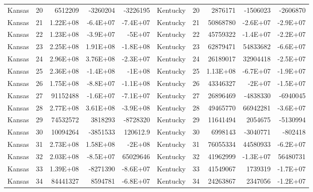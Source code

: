 \begin{landscape}
\begin{singlespace}
\begin{longtable}{lrrrr|lrrrr}
		Kansas &  20 & 6512209 & -3260204 & -3226195 & Kentucky &  20 & 2876171 & -1506023 & -2606870 \\
		Kansas &  21 & 1.22E+08 & -6.4E+07 & -7.4E+07 & Kentucky &  21 & 50868780 & -2.6E+07 & -2.9E+07 \\
		Kansas &  22 & 1.23E+08 & -3.9E+07 & -5E+07 & Kentucky &  22 & 45759322 & -1.4E+07 & -2.2E+07 \\
		Kansas &  23 & 2.25E+08 & 1.91E+08 & -1.8E+08 & Kentucky &  23 & 62879471 & 54833682 & -6.6E+07 \\
		Kansas &  24 & 2.96E+08 & 3.76E+08 & -2.3E+07 & Kentucky &  24 & 26189017 & 32904418 & -2.5E+07 \\
		Kansas &  25 & 2.36E+08 & -1.4E+08 & -1E+08 & Kentucky &  25 & 1.13E+08 & -6.7E+07 & -1.9E+07 \\
		Kansas &  26 & 1.75E+08 & -8.8E+07 & -1.1E+08 & Kentucky &  26 & 43346327 & -2E+07 & -1.5E+07 \\
		Kansas &  27 & 91152488 & -1.6E+07 & -7.1E+07 & Kentucky &  27 & 26896469 & -4838330 & -6940045 \\
		Kansas &  28 & 2.77E+08 & 3.61E+08 & -3.9E+08 & Kentucky &  28 & 49465770 & 66942281 & -3.6E+07 \\
		Kansas &  29 & 74532572 & 3818293 & -8728320 & Kentucky &  29 & 11641494 & 2054675 & -5130994 \\
		Kansas &  30 & 10094264 & -3851533 & 120612.9 & Kentucky &  30 & 6998143 & -3040771 & -802418 \\
		Kansas &  31 & 2.73E+08 & 1.58E+08 & -2E+08 & Kentucky &  31 & 76055334 & 44580933 & -6.2E+07 \\
		Kansas &  32 & 2.03E+08 & -8.5E+07 & 65029646 & Kentucky &  32 & 41962999 & -1.3E+07 & 56480731 \\
		Kansas &  33 & 1.39E+08 & -8271390 & -8.6E+07 & Kentucky &  33 & 41549067 & 1739319 & -1.7E+07 \\
		Kansas &  34 & 84441327 & 8594781 & -6.8E+07 & Kentucky &  34 & 24263867 & 2347056 & -1.2E+07\\


\end{longtable}
\end{singlespace}
\end{landscape}
